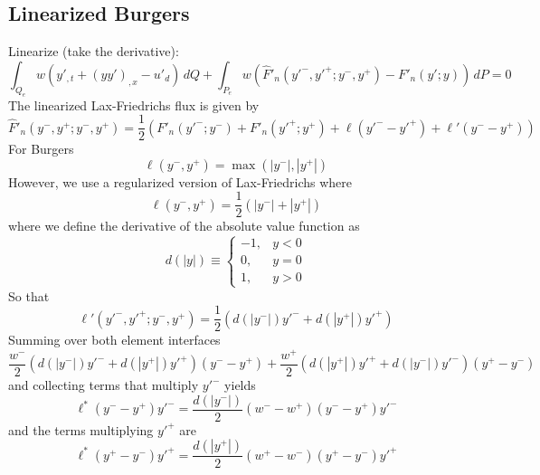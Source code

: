 \documentclass[12pt]{article}
\begin{document}
\subsection{Linearized Burgers}
Linearize (take the \frechet derivative):
\[ \int_{Q_e} w \left( y'_{,t} + \left(y y'\right)_{,x} 
   - u'_d \right) \,dQ +
   \int_{P_e} w \left( \widehat F'_n(y'^-,y'^+;y^-,y^+) - 
                                F'_n(y';y) \right) \,dP  = 0 \]
%
The linearized Lax-Friedrichs flux is given by
\[ \widehat F'_n(y^-,y^+;y^-,y^+) = 
   \frac{1}{2}\left( 
     F'_n(y'^-;y^-) + F'_n(y'^+;y^+) + 
     \ell \left( y'^- - y'^+ \right) +
     \ell' \left( y^- - y^+ \right) 
   \right) 
\]
For Burgers
\[ \ell(y^-,y^+) = \max( |y^-|, |y^+| ) \]
However, we use a regularized version of Lax-Friedrichs where 
\[ \ell(y^-,y^+) = \frac{1}{2}( |y^-| + |y^+| ) \]
where we define the derivative of the absolute value function as
\begin{equation} \label{e:dabs}
d(|y|) \equiv 
\left\{ 
\begin{array}{rl} 
  -1, & y<0 \\
   0, & y=0 \\
   1, & y>0
\end{array}
\right.
\end{equation}
So that
\[ \ell'(y'^-,y'^+;y^-,y^+) = \frac{1}{2}( d(|y^-|)y'^- + d(|y^+|)y'^+ ) \]
%
Summing over both element interfaces
\[ \frac{w^-}{2}( d(|y^-|)y'^- + d(|y^+|)y'^+ )(y^- - y^+) +
   \frac{w^+}{2}( d(|y^+|)y'^+ + d(|y^-|)y'^- )(y^+ - y^-) \]
and collecting terms that multiply $y'^-$ yields
\[ \ell^* (y^- - y^+) y'^- = \frac{d(|y^-|)}{2}(w^- - w^+)(y^- - y^+)y'^- \]
and the terms multiplying $y'^+$ are
\[ \ell^* (y^+ - y^-) y'^+ = \frac{d(|y^+|)}{2}(w^+ - w^-)(y^+ - y^-)y'^+ \]
\end{document}
